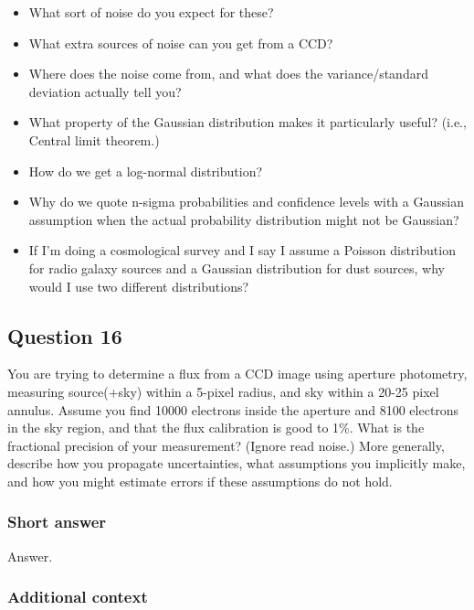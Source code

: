\documentclass[a4paper,10pt]{article}
\begin{document}
\begin{itemize}
    \item What sort of noise do you expect for these?
    \item What extra sources of noise can you get from a CCD?
    \item Where does the noise come from, and what does the variance/standard deviation actually tell you?
    \item What property of the Gaussian distribution makes it particularly useful? (i.e., Central limit theorem.)
    \item How do we get a log-normal distribution?
    \item Why do we quote n-sigma probabilities and confidence levels with a Gaussian assumption when the actual probability distribution might not be Gaussian?
    \item If I'm doing a cosmological survey and I say I assume a Poisson distribution for radio galaxy sources and a Gaussian distribution for dust sources, why would I use two different distributions?
\end{itemize}


\newpage
\subsection{Question 16}

You are trying to determine a flux from a CCD image using aperture photometry, measuring source(+sky) within a 5-pixel radius, and sky within a 20-25 pixel annulus. Assume you find 10000 electrons inside the aperture and 8100 electrons in the sky region, and that the flux calibration is good to 1\%. What is the fractional precision of your measurement? (Ignore read noise.) More generally, describe how you propagate uncertainties, what assumptions you implicitly make, and how you might estimate errors if these assumptions do not hold.

\subsubsection{Short answer}

Answer.

\subsubsection{Additional context}
\end{document}
